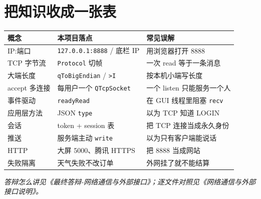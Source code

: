 \documentclass[UTF8,a4paper,11pt]{ctexart}
\begin{document}
\section{把知识收成一张表}

\begin{center}
\begin{tabular}{lll}
\toprule
概念 & 本项目落点 & 常见误解 \\
\midrule
IP:端口 & \texttt{127.0.0.1:8888} / 底栏 IP & 用浏览器打开 8888 \\
TCP 字节流 & \texttt{Protocol} 切帧 & 一次 read 等于一条消息 \\
大端长度 & \texttt{qToBigEndian} / \texttt{>I} & 按本机小端写长度 \\
accept 多连接 & 每用户一个 \texttt{QTcpSocket} & 一个 listen 只能服务一个人 \\
事件驱动 & \texttt{readyRead} & 在 GUI 线程里阻塞 \texttt{recv} \\
应用层方法 & JSON \texttt{type} & 以为 TCP 知道 LOGIN \\
会话 & token + session 表 & 把 TCP 连接当成永久身份 \\
推送 & 服务端主动 \texttt{write} & 以为只有客户端能说话 \\
HTTP & 大屏 5000、腾讯 HTTPS & 把 8888 当成网站 \\
失败隔离 & 天气失败不改订单 & 外网挂了就不能结算 \\
\bottomrule
\end{tabular}
\end{center}

\vspace{1em}
\noindent\textit{答辩怎么讲见《最终答辩-网络通信与外部接口》；逐文件对照见《网络通信与外部接口说明》。}
\end{document}
